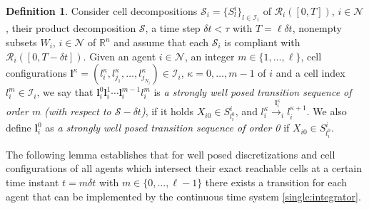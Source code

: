 \documentclass[reqno]{amsart}
\theoremstyle{plain}
\theoremstyle{definition}
\newtheorem{dfn}[thm]{Definition}
\numberwithin{equation}{section}
\begin{document}
\begin{dfn} \label{dfn:strongly:well:posed:seq}
Consider cell decompositions ${\ensuremath{\mathcal{S}}}_i=\{S_l^i\}_{l\in{\ensuremath{\mathcal{I}}}_i}$ of ${\ensuremath{\mathcal{R}}}_i([0,T])$, $i\in{\ensuremath{\mathcal{N}}}$, their product decomposition ${\ensuremath{\mathcal{S}}}$, a time step $\delta t<\tau$ with $T=\ell\delta t$, nonempty subsets $W_i$, $i\in{\ensuremath{\mathcal{N}}}$ of ${\ensuremath{\mathbb{R}^{{n}}}}$ and assume that each ${\ensuremath{\mathcal{S}}}_i$ is compliant with  ${\ensuremath{\mathcal{R}}}_i([0,T-\delta t])$. Given an agent $i\in{\ensuremath{\mathcal{N}}}$, an integer $m\in\{1,\ldots,\ell\}$, cell configurations ${\textbf{{l}}}^{\kappa}=(l_i^{\kappa},l_{j_1}^{\kappa},\ldots,l_{j_{N_i}}^{\kappa})\in{\ensuremath{\boldsymbol{\mathcal{I}}}}_i$, $\kappa=0,\ldots,m-1$ of $i$ and a cell index $l_i^m\in{\ensuremath{\mathcal{I}}}_i$, we say that  ${\textbf{{l}}}_i^0{\textbf{{l}}}_i^1\cdots{\textbf{{l}}}_i^{m-1}l_i^m$ is \textit{a strongly well posed transition sequence of order $m$ (with respect to ${\ensuremath{\mathcal{S}}}-\delta t$)}, if it holds $X_{i0}\in S_{l_i^0}^i$, and  $l_i^{\kappa}\overset{{\textbf{{l}}}_i^{\kappa}}{\longrightarrow_i}l_i^{\kappa+1}$. We also define ${\textbf{{l}}}_i^0$ as \textit{a strongly well posed transition sequence of order 0} if $X_{i0}\in S_{l_i^0}^i$.
\end{dfn}

\noindent The following lemma establishes that for well posed discretizations and cell configurations of all agents which intersect their exact reachable cells at a certain time instant $t=m\delta t$ with $m\in\{0,\ldots,\ell-1\}$ there exists a transition for each agent that can be implemented by the continuous time system \eqref{single:integrator}.  
\end{document}
